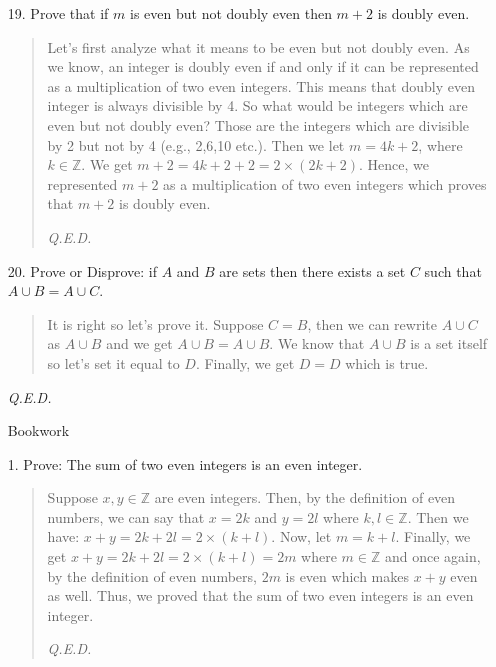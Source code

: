 \documentclass[12pt, a4paper]{article}                      %
\begin{document}
\begin{enumerate}
\item[19.]
Prove that if $m$ is even but not doubly even then $m + 2$ is doubly even.
\begin{quote}
Let's first analyze what it means to be even but not doubly even. As we know, an integer
is doubly even if and only if it can be represented as a multiplication of two even integers.
This means that doubly even integer is always divisible by 4. So what would be integers which are even
but not doubly even? Those are the integers which are divisible by 2 but not by 4 (e.g., 2,6,10 etc.).
Then we let $m = 4k + 2$, where $k \in \mathbb{Z}$. We get $m + 2 = 4k + 2 + 2 = 2 \times (2k + 2)$.
Hence, we represented $m + 2$ as a multiplication of two even integers which proves that $m + 2$ is
doubly even.
\begin{flushright}
\textit{Q.E.D.}
\end{flushright}
\end{quote}

\item[20.]
Prove or Disprove: if $A$ and $B$ are sets then there exists a set $C$ such that $A \cup B = A \cup C$.
\begin{quote}
It is right so let's prove it.
Suppose $C = B$, then we can rewrite $A \cup C$ as $A \cup B$ and we get $A \cup B = A \cup B$.
We know that $A \cup B$ is a set itself so let's set it equal to $D$. Finally, we get $D = D$ which
is true.
\end{quote}
\begin{flushright}
\textit{Q.E.D.}
\end{flushright}

\newpage
{\Large Bookwork}
\item[1.]
Prove: The sum of two even integers is an even integer.
\begin{quote}
Suppose $x, y \in \mathbb{Z}$ are even integers. Then, by the definition of even
numbers, we can say that $x = 2k$ and $y = 2l$ where $k, l \in \mathbb{Z}$.
Then we have: $x + y = 2k + 2l = 2 \times (k + l)$. Now, let $m = k + l$.
Finally, we get $x + y = 2k + 2l = 2 \times (k + l) = 2m$ where $m \in \mathbb{Z}$
and once again, by the definition of even numbers, $2m$ is even which makes $x + y$ even as well.
Thus, we proved that the sum of two even integers is an even integer.
\begin{flushright}
\textit{Q.E.D.}
\end{flushright}
\end{quote}


\end{enumerate}
\end{document}
